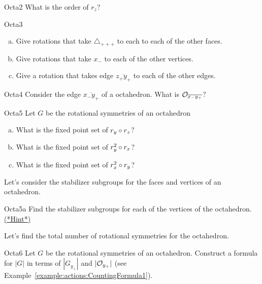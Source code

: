 \begin{exercise}{Octa2}
What is the order of $r_z$?
\end{exercise}

\begin{exercise}{Octa3}
\begin {enumerate}[(a)]
\item Give rotations that take $\triangle _{+++}$ to each to each of the other faces.
\item Give rotations that take  $x_-$ to each of the other vertices.
\item Give a rotation that takes edge $\overline{z_+y_+}$ to each of the other edges.
\end{enumerate}
\end{exercise} 
\begin {exercise}{Octa4}
Consider the edge $\overline{x_-y_+}$ of a octahedron. What is ${\cal O}_{\overline{x_-y_+}}$?
\end {exercise}

\begin {exercise}{Octa5}
Let $G$ be the rotational symmetries of an octahedron
\begin {enumerate}[(a)]
\item  What is the fixed point set of $r_{y}\circ r_{z}$?
\item What is the fixed point set of $r_{y}^2\circ r_{x}$? 
\item What is the fixed point set of $r_{x}^2\circ r_{y}$?
\end{enumerate}
\end {exercise}

Let's consider the stabilizer subgroups for the faces and vertices of an octahedron.  
 
\begin{exercise}{Octa5a}
Find the stabilizer subgroups for each of the vertices of the octahedron. 
\hyperref[sec:actions:hints]{(*Hint*)}
\end{exercise}

Let's find the total number of rotational symmetries for the octahedron. 

\begin{exercise}{Octa6} 
Let $G$ be the rotational symmetries of an octahedron. Construct a formula for $|G|$ in terms of $| G_{y_+}|$ and $|{\cal O}_{y_+}|$ (see Example~\ref{example:actions:CountingFormula1}).
 \end {exercise}

